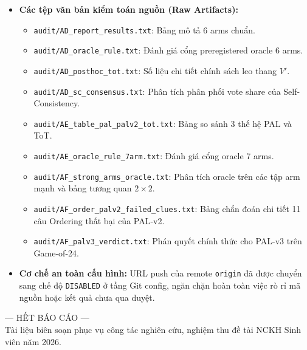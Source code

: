\documentclass[11pt,a4paper]{report}
\begin{document}
\begin{itemize}[leftmargin=*]
    \item \textbf{Các tệp văn bản kiểm toán nguồn (Raw Artifacts):}
    \begin{itemize}
        \item \texttt{audit/AD\_report\_results.txt}: Bảng mô tả 6 arms chuẩn.
        \item \texttt{audit/AD\_oracle\_rule.txt}: Đánh giá cổng preregistered oracle 6 arms.
        \item \texttt{audit/AD\_posthoc\_tot.txt}: Số liệu chi tiết chính sách leo thang $V'$.
        \item \texttt{audit/AD\_sc\_consensus.txt}: Phân tích phân phối vote share của Self-Consistency.
        \item \texttt{audit/AE\_table\_pal\_palv2\_tot.txt}: Bảng so sánh 3 thế hệ PAL và ToT.
        \item \texttt{audit/AE\_oracle\_rule\_7arm.txt}: Đánh giá cổng oracle 7 arms.
        \item \texttt{audit/AF\_strong\_arms\_oracle.txt}: Phân tích oracle trên các tập arm mạnh và bảng tương quan $2\times 2$.
        \item \texttt{audit/AF\_order\_palv2\_failed\_clues.txt}: Bảng chẩn đoán chi tiết 11 câu Ordering thất bại của PAL-v2.
        \item \texttt{audit/AF\_palv3\_verdict.txt}: Phán quyết chính thức cho PAL-v3 trên Game-of-24.
    \end{itemize}
    \item \textbf{Cơ chế an toàn cấu hình:} URL push của remote \texttt{origin} đã được chuyển sang chế độ \texttt{DISABLED} ở tầng Git config, ngăn chặn hoàn toàn việc rò rỉ mã nguồn hoặc kết quả chưa qua duyệt.
\end{itemize}

\vspace{1cm}
\begin{center}
\small\color{secondary}
--- HẾT BÁO CÁO --- \\
Tài liệu biên soạn phục vụ công tác nghiên cứu, nghiệm thu đề tài NCKH Sinh viên năm 2026.
\end{center}
\end{document}
